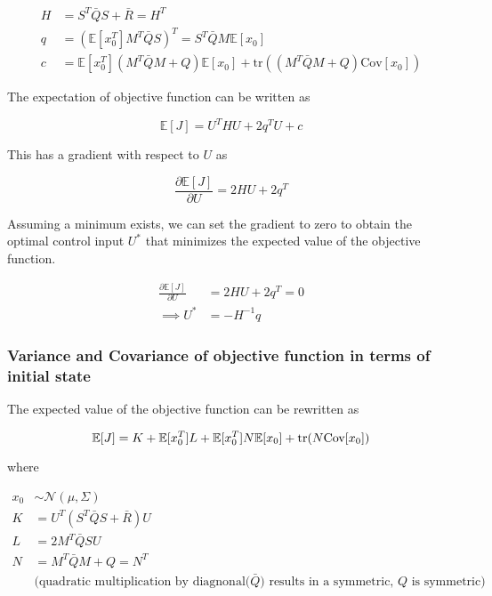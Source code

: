 \documentclass{article}
\begin{document}
$$
\begin{aligned}
  H &= S^T \bar{Q} S + \bar{R} = H^T \\
  q &= (\mathbb{E}[x_0^T] M^T \bar{Q} S)^T = S^T \bar{Q} M \mathbb{E}[x_0] \\
  c &= \mathbb{E}[x_0^T] (M^T \bar{Q} M + Q) \mathbb{E}[x_0] + \text{tr}((M^T \bar{Q} M + Q) \text{Cov}[x_0])
\end{aligned}
$$

The expectation of objective function can be written as

$$
\mathbb{E}[J] = U^T H U + 2 q^T U + c
$$

This has a gradient with respect to $U$ as

$$
\frac{\partial \mathbb{E}[J]}{\partial U} = 2 H U + 2 q^T
$$

Assuming a minimum exists, we can set the gradient to zero to obtain the optimal control input $U^*$ that minimizes the expected value of the objective function.

\begin{equation}
  \begin{aligned}
    \frac{\partial \mathbb{E}[J]}{\partial U} &= 2 H U + 2 q^T = 0 \\
    \implies U^* &= -H^{-1} q
  \end{aligned}
\end{equation}

\subsubsection{Variance and Covariance of objective function in terms of initial state}


The expected value of the objective function can be rewritten as

$$
\mathbb{E}[J] = K + \mathbb{E}[x_0^T] L + \mathbb{E}[x_0^T] N \mathbb{E}[x_0] + \text{tr}(N \text{Cov}[x_0]) \\
$$

where

$$
\begin{aligned}
  x_0 &\sim \mathcal{N}(\mu, \Sigma) \\
  K &= U^T(S^T \bar{Q} S + \bar{R}) U \\
  L &= 2 M^T \bar{Q} S U \\
  N &= M^T \bar{Q} M + Q = N^T \\
  &\text{(quadratic multiplication by diagnonal($\bar{Q}$) results in a symmetric, $Q$ is symmetric)} \\
\end{aligned}
$$
\end{document}
